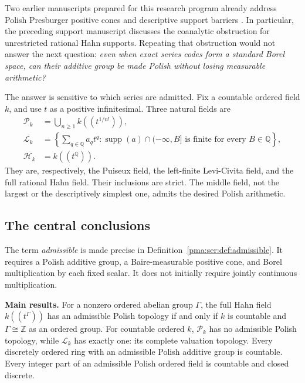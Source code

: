 \documentclass[11pt]{article}
\numberwithin{equation}{section}
\theoremstyle{definition}
\theoremstyle{remark}
\newcommand{\Z}{\mathbb Z}
\newcommand{\Q}{\mathbb Q}
\newcommand{\supp}{\operatorname{supp}}
\newcommand{\Pk}{\mathcal P_k}
\newcommand{\Lk}{\mathcal L_k}
\newcommand{\Hk}{\mathcal H_k}
\begin{document}
Two earlier manuscripts prepared for this research program already address
Polish Presburger positive cones and descriptive support barriers
\cite{s09:PriorPresburger,s09:PriorSupport}. In particular, the preceding support
manuscript discusses the coanalytic obstruction for unrestricted rational Hahn
supports. Repeating that obstruction would not answer the next question:
\emph{even when exact series codes form a standard Borel space, can their
additive group be made Polish without losing measurable arithmetic?}

The answer is sensitive to which series are admitted. Fix a countable ordered
field $k$, and use $t$ as a positive infinitesimal. Three natural fields are
\begin{align}
 \Pk&=\bigcup_{n\geq1}k((t^{1/n!})), \label{pma:ser:eq:Pintro}\\
 \Lk&=\left\{\sum_{q\in\Q}a_qt^q:
  \supp(a)\cap(-\infty,B]\text{ is finite for every }B\in\Q\right\},
  \label{pma:ser:eq:Lintro}\\
 \Hk&=k((t^\Q)). \label{pma:ser:eq:Hintro}
\end{align}
They are, respectively, the Puiseux field, the left-finite Levi-Civita field,
and the full rational Hahn field. Their inclusions are strict. The middle
field, not the largest or the descriptively simplest one, admits the desired
Polish arithmetic.

\subsection{The central conclusions}

The term \emph{admissible} is made precise in Definition~\ref{pma:ser:def:admissible}.
It requires a Polish additive group, a Baire-measurable positive cone, and Borel
multiplication by each fixed scalar. It does not initially require jointly
continuous multiplication.

\begin{statementbox}
\textbf{Main results.}
For a nonzero ordered abelian group $\Gamma$, the full Hahn field
$k((t^\Gamma))$ has an admissible Polish topology if and only if $k$ is
countable and $\Gamma\cong\Z$ as an ordered group.
For countable ordered $k$, $\Pk$ has no admissible Polish topology, while
$\Lk$ has exactly one: its complete valuation topology.
Every discretely ordered ring with an admissible Polish additive group is
countable. Every integer part of an admissible Polish ordered field is
countable and closed discrete.
\end{statementbox}
\end{document}
